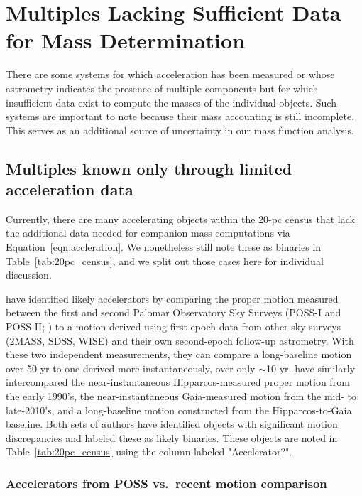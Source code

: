 \documentclass[twocolumn,tighten,twocolappendix]{aastex631}
\begin{document}
\section{Multiples Lacking Sufficient Data for Mass Determination\label{sec:multiples}}

There are some systems for which acceleration has been measured or whose astrometry indicates the presence of multiple components but for which insufficient data exist to compute the masses of the individual objects. Such systems are important to note because their mass accounting is still incomplete. This serves as an additional source of uncertainty in our mass function analysis.

\subsection{Multiples known only through limited acceleration data\label{sec:accelerators_lacking_other_info}}

Currently, there are many accelerating objects within the 20-pc census that lack the additional data needed for companion mass computations via Equation~\ref{eqn:accleration}. We nonetheless still note these as binaries in Table~\ref{tab:20pc_census}, and we split out those cases here for individual discussion.

\cite{khovritchev2015} have identified likely accelerators by comparing the proper motion measured between the first and second Palomar Observatory Sky Surveys (POSS-I and POSS-II; \citealt{minkowski1963, reid1991, lasker1998}) to a motion derived using first-epoch data from other sky surveys (2MASS, SDSS, WISE) and their own second-epoch follow-up astrometry. With these two independent measurements, they can compare a long-baseline motion over 50 yr to one derived more instantaneously, over only $\sim$10 yr. \cite{brandt2021} have similarly intercompared the near-instantaneous Hipparcos-measured proper motion from the early 1990's, the near-instantaneous Gaia-measured motion from the mid- to late-2010's, and a long-baseline motion constructed from the Hipparcos-to-Gaia baseline. Both sets of authors have identified objects with significant motion discrepancies and labeled these as likely binaries. These objects are noted in Table~\ref{tab:20pc_census} using the column labeled "Accelerator?".

\subsubsection{Accelerators from POSS vs.\ recent motion comparison\label{sec:accelerators}}
\end{document}

